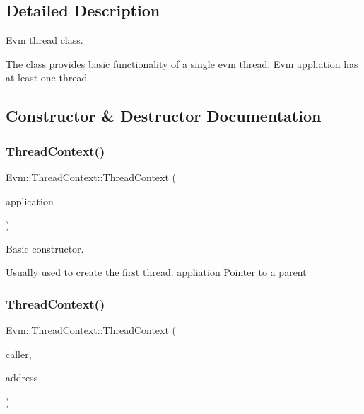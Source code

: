 \subsection{Detailed Description}
\mbox{\hyperlink{namespace_evm}{Evm}} thread class. 

The class provides basic functionality of a single evm thread. \mbox{\hyperlink{namespace_evm}{Evm}} appliation has at least one thread 

\subsection{Constructor \& Destructor Documentation}
\mbox{\label{struct_evm_1_1_thread_context_acfbc6d50abd403e1d5ad80844e01cf66}} 
\subsubsection{\texorpdfstring{Thread\+Context()}{ThreadContext()}\hspace{0.1cm}{\footnotesize\ttfamily [1/2]}}
{\footnotesize\ttfamily Evm\+::\+Thread\+Context\+::\+Thread\+Context (\begin{DoxyParamCaption}\item[{\mbox{\hyperlink{struct_evm_1_1_application}{Application}} $\ast$}]{application }\end{DoxyParamCaption})}



Basic constructor. 

Usually used to create the first thread.  appliation Pointer to a parent \mbox{\label{struct_evm_1_1_thread_context_ab48faed75f15ece141cc169b9308a634}} 
\subsubsection{\texorpdfstring{Thread\+Context()}{ThreadContext()}\hspace{0.1cm}{\footnotesize\ttfamily [2/2]}}
{\footnotesize\ttfamily Evm\+::\+Thread\+Context\+::\+Thread\+Context (\begin{DoxyParamCaption}\item[{const \mbox{\hyperlink{struct_evm_1_1_thread_context}{Thread\+Context}} \&}]{caller,  }\item[{uint32\+\_\+t}]{address }\end{DoxyParamCaption})}



